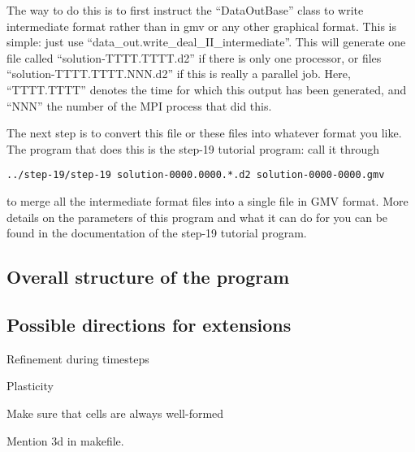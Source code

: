 \documentclass{article}
\begin{document}
The way to do this is to first instruct the ``DataOutBase'' class to
write intermediate format rather than in gmv or any other graphical
format. This is simple: just use
``data\_out.write\_deal\_II\_intermediate''. This will generate one file
called ``solution-TTTT.TTTT.d2'' if there is only one processor, or
files ``solution-TTTT.TTTT.NNN.d2'' if this is really a parallel
job. Here, ``TTTT.TTTT'' denotes the time for which this output has
been generated, and ``NNN'' the number of the MPI process that did this.

The next step is to convert this file or these files into whatever
format you like. The program that does this is the step-19 tutorial program:
call it through
\begin{center}
  \texttt{../step-19/step-19 solution-0000.0000.*.d2 solution-0000-0000.gmv}
\end{center}
to merge all the intermediate format files into a single file in GMV
format. More details on the parameters of this program and what it can do for
you can be found in the documentation of the step-19 tutorial program.



\subsection*{Overall structure of the program}
\subsection*{Possible directions for extensions}

Refinement during timesteps

Plasticity

Make sure that cells are always well-formed

Mention 3d in makefile.
\end{document}
